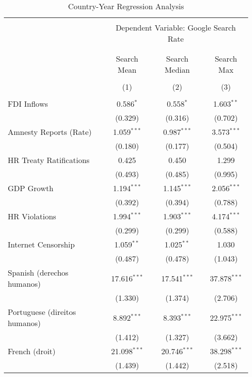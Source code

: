 
\begin{table}[!htbp] \centering 
  \caption{Country-Year Regression Analysis} 
  \label{} 
\begin{tabular}{@{\extracolsep{5pt}}lccc} 
\\[-1.8ex]\hline 
\hline \\[-1.8ex] 
 & \multicolumn{3}{c}{Dependent Variable: Google Search Rate} \\ 
\cline{2-4} 
\\[-1.8ex] & \multicolumn{3}{c}{ } \\ 
 & Search Mean & Search Median & Search Max \\ 
\\[-1.8ex] & (1) & (2) & (3)\\ 
\hline \\[-1.8ex] 
 FDI Inflows & 0.586$^{*}$ & 0.558$^{*}$ & 1.603$^{**}$ \\ 
  & (0.329) & (0.316) & (0.702) \\ 
  Amnesty Reports (Rate) & 1.059$^{***}$ & 0.987$^{***}$ & 3.573$^{***}$ \\ 
  & (0.180) & (0.177) & (0.504) \\ 
  HR Treaty Ratifications & 0.425 & 0.450 & 1.299 \\ 
  & (0.493) & (0.485) & (0.995) \\ 
  GDP Growth & 1.194$^{***}$ & 1.145$^{***}$ & 2.056$^{***}$ \\ 
  & (0.392) & (0.394) & (0.788) \\ 
  HR Violations & 1.994$^{***}$ & 1.903$^{***}$ & 4.174$^{***}$ \\ 
  & (0.299) & (0.299) & (0.588) \\ 
  Internet Censorship & 1.059$^{**}$ & 1.025$^{**}$ & 1.030 \\ 
  & (0.487) & (0.478) & (1.043) \\ 
  Spanish (derechos humanos) & 17.616$^{***}$ & 17.541$^{***}$ & 37.878$^{***}$ \\ 
  & (1.330) & (1.374) & (2.706) \\ 
  Portuguese (direitos humanos) & 8.892$^{***}$ & 8.393$^{***}$ & 22.975$^{***}$ \\ 
  & (1.412) & (1.327) & (3.662) \\ 
  French (droit) & 21.098$^{***}$ & 20.746$^{***}$ & 38.298$^{***}$ \\ 
  & (1.439) & (1.442) & (2.518) \\ 

\end{tabular}
\end{table}
